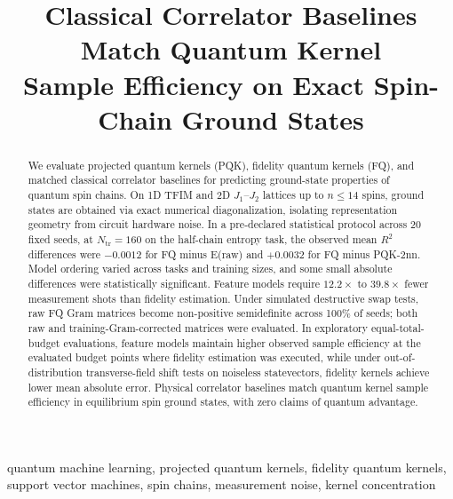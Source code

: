 \documentclass[conference]{IEEEtran}
\begin{document}
\title{Classical Correlator Baselines Match Quantum Kernel\\
Sample Efficiency on Exact Spin-Chain Ground States}

\author{
}

\maketitle

\begin{abstract}
We evaluate projected quantum kernels (PQK), fidelity quantum kernels (FQ),
and matched classical correlator baselines for predicting ground-state
properties of quantum spin chains. On 1D TFIM and 2D $J_1$--$J_2$ lattices
up to $n\le 14$ spins, ground states are obtained via exact numerical
diagonalization, isolating representation geometry from circuit hardware
noise. In a pre-declared statistical protocol across 20 fixed seeds, at $N_{\mathrm{tr}}=160$ on the half-chain entropy task, the observed mean $R^2$ differences were $-0.0012$ for FQ minus E(raw) and $+0.0032$ for FQ minus PQK-2nn. Model ordering varied across tasks and training sizes, and some small absolute differences were statistically significant. Feature models require $12.2\times$ to $39.8\times$ fewer measurement shots than fidelity estimation. Under simulated destructive swap tests, raw FQ Gram matrices
become non-positive semidefinite across 100\% of seeds; both raw and
training-Gram-corrected matrices were evaluated. In exploratory equal-total-budget
evaluations, feature models maintain higher observed sample efficiency at the
evaluated budget points where fidelity estimation was executed, while under
out-of-distribution transverse-field shift tests on noiseless statevectors,
fidelity kernels achieve lower mean absolute error. Physical correlator baselines match quantum kernel sample efficiency
in equilibrium spin ground states, with zero claims of quantum advantage.
\end{abstract}

\begin{IEEEkeywords}
quantum machine learning, projected quantum kernels, fidelity quantum kernels,
support vector machines, spin chains, measurement noise, kernel concentration
\end{IEEEkeywords}
\end{document}
